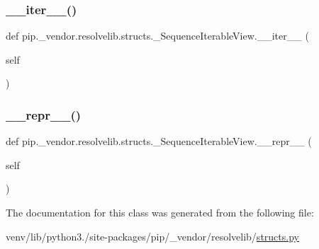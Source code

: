 \subsubsection{\texorpdfstring{\+\_\+\+\_\+iter\+\_\+\+\_\+()}{\_\_iter\_\_()}}
{\footnotesize\ttfamily def pip.\+\_\+vendor.\+resolvelib.\+structs.\+\_\+\+Sequence\+Iterable\+View.\+\_\+\+\_\+iter\+\_\+\+\_\+ (\begin{DoxyParamCaption}\item[{}]{self }\end{DoxyParamCaption})}

\mbox{\label{classpip_1_1__vendor_1_1resolvelib_1_1structs_1_1__SequenceIterableView_a7673839da4cb15b50282ac47f5fedd6a}} 
\subsubsection{\texorpdfstring{\+\_\+\+\_\+repr\+\_\+\+\_\+()}{\_\_repr\_\_()}}
{\footnotesize\ttfamily def pip.\+\_\+vendor.\+resolvelib.\+structs.\+\_\+\+Sequence\+Iterable\+View.\+\_\+\+\_\+repr\+\_\+\+\_\+ (\begin{DoxyParamCaption}\item[{}]{self }\end{DoxyParamCaption})}



The documentation for this class was generated from the following file\+:\begin{DoxyCompactItemize}
\item 
venv/lib/python3./site-\/packages/pip/\+\_\+vendor/resolvelib/\hyperlink{structs_8py}{structs.\+py}\end{DoxyCompactItemize}
